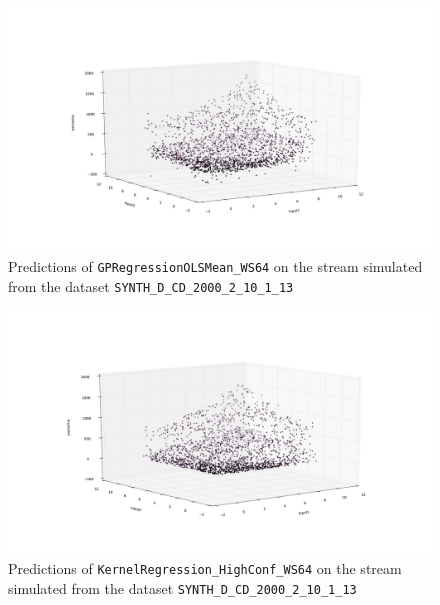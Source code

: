 \begin{figure}[htbp]
  \centering
    \includegraphics[width=\linewidth]{./Figures/gpreg_olsmean_ws64_approximated_func_SYNTH_D_CD_2000_2_10_1_13.pdf}
  \caption{Predictions of \texttt{GPRegressionOLSMean\_WS64} on the stream simulated from the dataset \texttt{SYNTH\_D\_CD\_2000\_2\_10\_1\_13}}
  \label{fig:gpreg_olsmean_ws64_approximated_func_SYNTH_D_CD_2000_2_10_1_13}
\end{figure}

\begin{figure}[htbp]
  \centering
    \includegraphics[width=\linewidth]{./Figures/kreg_ws64_approximated_func_SYNTH_D_CD_2000_2_10_1_13.pdf}
  \caption{Predictions of \texttt{KernelRegression\_HighConf\_WS64} on the stream simulated from the dataset \texttt{SYNTH\_D\_CD\_2000\_2\_10\_1\_13}}
  \label{fig:kreg_ws64_approximated_func_SYNTH_D_CD_2000_2_10_1_13}
\end{figure}

